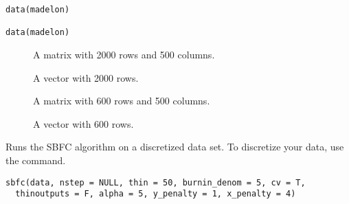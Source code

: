 \documentclass[a4paper]{book}
\begin{document}
%
\begin{Usage}
\begin{verbatim}
data(madelon)

data(madelon)
\end{verbatim}
\end{Usage}
%
\begin{Format}
\begin{description}

\item[] A matrix with 2000 rows and 500 columns.
\item[] A vector with 2000 rows.
\item[] A matrix with 600 rows and 500 columns.
\item[] A vector with 600 rows.

\end{description}
\end{Format}
%
\begin{References}\relax
{}

\end{References}
%
\begin{Description}\relax
Runs the SBFC algorithm on a discretized data set. To discretize your data, use the  command.
\end{Description}
%
\begin{Usage}
\begin{verbatim}
sbfc(data, nstep = NULL, thin = 50, burnin_denom = 5, cv = T,
  thinoutputs = F, alpha = 5, y_penalty = 1, x_penalty = 4)
\end{verbatim}
\end{Usage}
%
\end{document}
